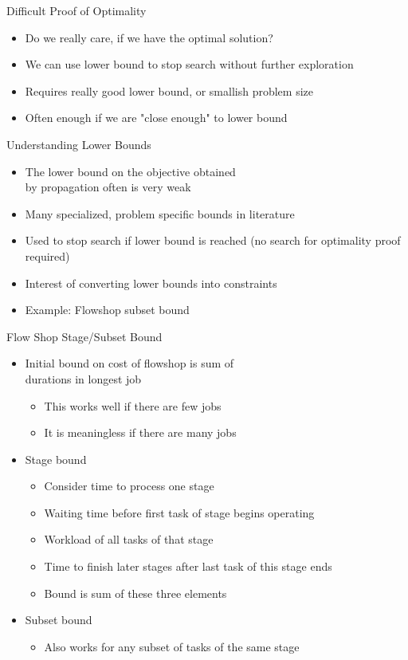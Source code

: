 \begin{frame}{Difficult Proof of Optimality}
\begin{itemize}
    \item Do we really care, if we have the optimal solution?
    \item We can use lower bound to stop search without further exploration
    \item Requires really good lower bound, or smallish problem size
    \item Often enough if we are "close enough" to lower bound
\end{itemize}
    
\end{frame}

\begin{frame}{Understanding Lower Bounds}
\begin{itemize}
    \item The lower bound on the objective obtained \\by propagation often is very weak
    \item Many specialized, problem specific bounds in literature
    \item Used to stop search if lower bound is reached (no search for optimality proof required) 
    \item Interest of converting lower bounds into constraints
    \item Example: Flowshop subset bound
\end{itemize}
\end{frame}

\begin{frame}{Flow Shop Stage/Subset Bound}
\begin{itemize}
    \item Initial bound on cost of flowshop is sum of \\durations in longest job
    \begin{itemize}
    \item This works well if there are few jobs
    \item It is meaningless if there are many jobs
    \end{itemize}
    \item Stage bound
    \begin{itemize}
    \item Consider time to process one stage
    \item Waiting time before first task of stage begins operating
    \item Workload of all tasks of that stage
    \item Time to finish later stages after last task of this stage ends
    \item Bound is sum of these three elements 
    \end{itemize}
    \item Subset bound
    \begin{itemize}
        \item Also works for any subset of tasks of the same stage
    \end{itemize}
\end{itemize}    
\end{frame}

